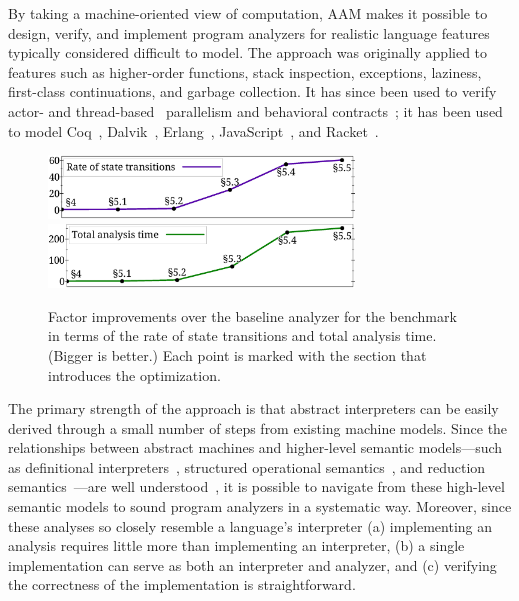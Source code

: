 \documentclass[9pt]{sigplanconf} %
\begin{document}
%

By taking a machine-oriented view of computation, AAM makes it possible to design, verify, and implement program analyzers for realistic language features typically considered difficult to model.
%
The approach was originally applied to features such as higher-order functions, stack inspection, exceptions, laziness, first-class continuations, and garbage collection.
%
It has since been used to verify actor-\cite{local:DOsualdo:12A} and thread-based~\cite{dvanhorn:Might2011Family} parallelism and behavioral contracts~\cite{dvanhorn:TobinHochstadt2012Higherorder};
%
it has been used to model Coq~\cite{local:harvard}, Dalvik~\cite{local:dalvik}, Erlang~\cite{local:DOsualdo:12B}, JavaScript~\cite{local:DBLP:journals/corr/abs-1109-4467}, and Racket~\cite{dvanhorn:TobinHochstadt2012Higherorder}.

\begin{figure}[t]
\small
\begin{center}
\includegraphics[width=3.2in]{church-relative-speed}
\includegraphics[width=3.2in]{church-relative-time}
\vspace{-1.5em}
\end{center}
\caption{
Factor improvements over the baseline analyzer for the \Church{} benchmark in terms of the rate of state transitions and total analysis time.
%
(Bigger is better.)
%
Each point is marked with the section that introduces the optimization.}
\label{fig:churchtime}
\end{figure}

The primary strength of the approach is that abstract interpreters can be easily derived through a small number of steps from existing machine models.
%
Since the relationships between abstract machines and higher-level semantic models---such as definitional interpreters~\cite{dvanhorn:reynolds-hosc98}, structured operational semantics~\cite{dvanhorn:Plotkin1981Structural}, and reduction semantics~\cite{dvanhorn:Felleisen2009Semantics}---are well understood~\cite{dvanhorn:Danvy:DSc}, it is possible to navigate from these high-level semantic models to sound program analyzers in a systematic way.
%
Moreover, since these analyses so closely resemble a language's interpreter
%
(a) implementing an analysis requires little more than implementing an interpreter,
%
(b) a single implementation can serve as both an interpreter and analyzer, and
%
(c) verifying the correctness of the implementation is straightforward.
\end{document}
